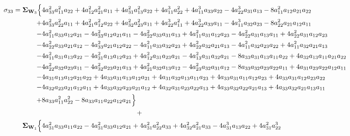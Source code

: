 \documentclass{article}
\begin{document}
\begin{equation}
\begin{aligned}
 \sigma_{33} =  \mathbf{\Sigma}_{\textbf{W}_{3}} \Bigl\{ & 4 a_{33}^{2} a_{11}^{2} a_{22} + 4 a_{12}^{2} a_{21}^{2} a_{11} + 4 a_{31}^{2} a_{13}^{2} a_{22} + 4 a_{11}^{3} a_{22}^{2} + 4 a_{11}^{3} a_{33} a_{22} - 4 a_{22}^{3} a_{31} a_{13} - 8 a_{11}^{2} a_{12} a_{21} a_{22} \\
+&4 a_{33}^{2} a_{22}^{2} a_{11} + 4 a_{21}^{2} a_{12}^{2} a_{22} + 4 a_{32}^{2} a_{23}^{2} a_{11} + 4 a_{22}^{3} a_{11}^{2} + 4 a_{22}^{3} a_{33} a_{11} - 4 a_{11}^{3} a_{32} a_{23} - 8 a_{22}^{2} a_{21} a_{12} a_{11} \\
-&4 a_{11}^{2} a_{33} a_{12} a_{21} - 4 a_{33}^{2} a_{12} a_{21} a_{11} - 4 a_{22}^{2} a_{33} a_{31} a_{13} + 4 a_{11}^{2} a_{31} a_{12} a_{23} - 4 a_{22}^{2} a_{31} a_{13} a_{11} + 4 a_{22}^{2} a_{31} a_{12} a_{23} \\
-&4 a_{22}^{2} a_{33} a_{21} a_{12} - 4 a_{33}^{2} a_{21} a_{12} a_{22} - 4 a_{11}^{2} a_{33} a_{32} a_{23} + 4 a_{22}^{2} a_{32} a_{21} a_{13} - 4 a_{11}^{2} a_{32} a_{23} a_{22} + 4 a_{11}^{2} a_{32} a_{21} a_{13} \\
-&4 a_{11}^{2} a_{31} a_{13} a_{22} - 4 a_{31}^{2} a_{13} a_{12} a_{23} + 4 a_{12}^{2} a_{31} a_{23} a_{21} - 4 a_{13}^{2} a_{31} a_{32} a_{21} - 8 a_{33} a_{31} a_{13} a_{11} a_{22} + 4 a_{32} a_{13} a_{11} a_{21} a_{22} \\
-&4 a_{22}^{2} a_{32} a_{23} a_{11} - 4 a_{32}^{2} a_{23} a_{21} a_{13} + 4 a_{21}^{2} a_{32} a_{13} a_{12} - 4 a_{23}^{2} a_{32} a_{31} a_{12} - 8 a_{33} a_{32} a_{23} a_{22} a_{11} + 4 a_{31} a_{23} a_{22} a_{12} a_{11} \\
-&4 a_{31} a_{13} a_{12} a_{21} a_{22} + 4 a_{33} a_{31} a_{13} a_{12} a_{21} +4 a_{31} a_{32} a_{13} a_{11} a_{23} + 4 a_{33} a_{31} a_{11} a_{12} a_{23} + 4 a_{33} a_{31} a_{12} a_{23} a_{22} \\
-&4 a_{32} a_{23} a_{21}a_{12} a_{11} + 4 a_{33} a_{32} a_{23} a_{21} a_{12} + 4 a_{32} a_{31} a_{23} a_{22} a_{13} + 4 a_{33} a_{32} a_{22} a_{21} a_{13} + 4 a_{33} a_{32} a_{21} a_{13} a_{11} \\
+&8 a_{33} a_{11}^{2} a_{22}^{2} - 8 a_{33} a_{11} a_{22} a_{12} a_{21}\Bigr\} \\
& \qquad \qquad \qquad \qquad \qquad \qquad \qquad + \\
\mathbf{\Sigma}_{\textbf{W}_{1}} \Bigl\{&4 a_{31}^{2} a_{33} a_{11} a_{22} - 4 a_{31}^{2} a_{33} a_{12} a_{21} + 4 a_{31}^{2} a_{22}^{2} a_{33} + 4 a_{32}^{2} a_{21}^{2} a_{33} - 4 a_{31}^{3} a_{13} a_{22} + 4 a_{31}^{2} a_{22}^{3} \\

\end{aligned}
\end{equation}
\end{document}
